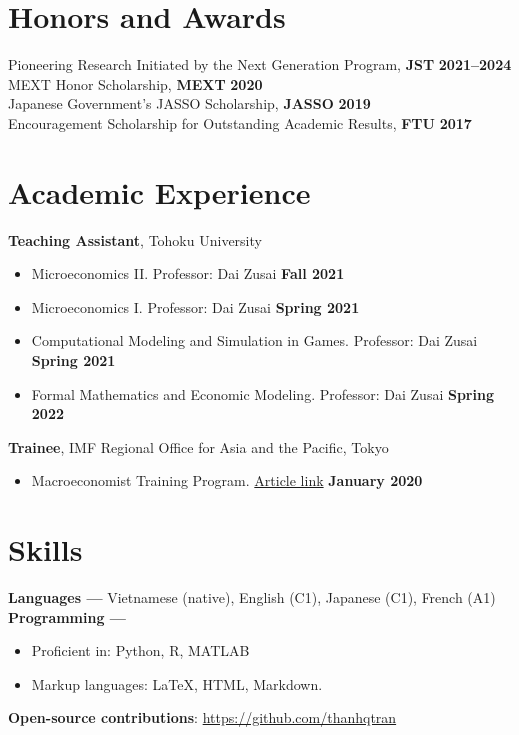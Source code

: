 \documentclass[margin,line]{res}
\begin{document}
\begin{resume}
\section{\sc Honors and Awards}
Pioneering Research Initiated by the Next Generation Program, {\bf JST} \hfill {\bf 2021--2024}\\
MEXT Honor Scholarship, {\bf MEXT} \hfill {\bf 2020}\\
Japanese Government's JASSO Scholarship, {\bf JASSO} \hfill {\bf 2019}\\
Encouragement Scholarship for Outstanding Academic Results, {\bf FTU} \hfill {\bf 2017}\\

\vspace{-1em}

\section{\sc Academic Experience}
{\bf Teaching Assistant}, Tohoku University
\vspace*{.05in}
\begin{itemize}
\item[ ] Microeconomics II. Professor: Dai Zusai \hfill {\bf Fall 2021}
\item[ ] Microeconomics I. Professor: Dai Zusai \hfill {\bf Spring 2021}
\item[ ] Computational Modeling and Simulation in Games. Professor: Dai Zusai \hfill {\bf Spring 2021}
\item[ ] Formal Mathematics and Economic Modeling. Professor: Dai Zusai \hfill {\bf Spring 2022}
\end{itemize}

{\bf Trainee}, IMF Regional Office for Asia and the Pacific, Tokyo
\vspace*{.05in}
\begin{itemize}
\item[ ] Macroeconomist Training Program. \href{https://www.imf.org/en/Countries/ResRep/OAP-Home/~/link.aspx?_id=C2F64E8412B64A86BD37DDEB8439312B&_z=z}{Article link} \hfill {\bf January 2020}
\end{itemize}


\section{\sc Skills}
{\bf Languages ---}
\vspace*{.05in}
Vietnamese (native), English (C1), Japanese (C1), French (A1)\\
{\bf Programming ---}
\vspace*{.05in}
\begin{itemize}
	\item Proficient in: Python, R, MATLAB
	\item Markup languages: \LaTeX, HTML, Markdown.
\end{itemize}
\vspace*{.05in}
{\bf Open-source contributions}: \url{https://github.com/thanhqtran}


\end{resume}
\end{document}
